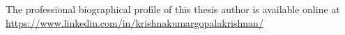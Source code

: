 
\cleardoublepage

\newpage\null\thispagestyle{plain}
\vfill
\parbox{130mm}{
    \doublespacing
    \noindent The professional biographical profile of this thesis author is available online at
    \url{https://www.linkedin.com/in/krishnakumargopalakrishnan/}
}
\blackurl
{}
\regularurl

